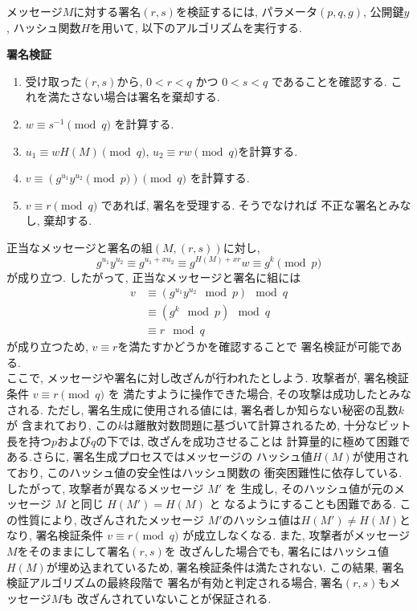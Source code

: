 \vspace{1em}
メッセージ$M$に対する署名$(r, s)$を検証するには, パラメータ$(p,q,g)$, 
公開鍵$y$, ハッシュ関数$H$を用いて, 以下のアルゴリズムを実行する.
\vspace{1em}
\let\ltxlist\list
\begin{breakitembox}[l]{\textbf{署名検証}}
  　
  \begin{enumerate}[parsep=7pt]
    \item 受け取った$(r,s)$から, $0<r<q$ かつ $0<s<q$ であることを確認する. 
    これを満たさない場合は署名を棄却する.
    \item $w\equiv s^{-1}\pmod q$ を計算する.
    \item $u_1\equiv wH(M)\pmod q$, $u_2\equiv rw\pmod q$を計算する.
    \item $v\equiv (g^{u_1}y^{u_2}\pmod p)\pmod q$ を計算する.
    \item $v\equiv r\pmod  q$ であれば, 署名を受理する. そうでなければ
    不正な署名とみなし, 棄却する.
  \end{enumerate}
\end{breakitembox}
\vspace{1em}
\indent 正当なメッセージと署名の組$(M, (r, s))$に対し, 
\[
  g^{u_1}y^{u_2}\equiv g^{u_1+xu_2} \equiv g^{H(M)+xr}w\equiv g^{k}\pmod p
\]
が成り立つ. したがって, 正当なメッセージと署名に組には 
\begin{align*}
  v &\equiv (g^{u_1}y^{u_2} \mod p) \mod q \\
    &\equiv (g^k \mod p) \mod q \\
    &\equiv r \mod q
\end{align*}
が成り立つため, $v\equiv r$を満たすかどうかを確認することで
署名検証が可能である.\\
\indent ここで, メッセージや署名に対し改ざんが行われたとしよう. 
攻撃者が, 署名検証条件 $v \equiv r \pmod{q}$ を
満たすように操作できた場合, その攻撃は成功したとみなされる. ただし, 
署名生成に使用される値には, 署名者しか知らない秘密の乱数$k$が
含まれており, この$k$は離散対数問題に基づいて計算されるため, 
十分なビット長を持つ$p$および$q$の下では, 改ざんを成功させることは
計算量的に極めて困難である.さらに, 署名生成プロセスではメッセージの
ハッシュ値$H(M)$が使用されており, このハッシュ値の安全性はハッシュ関数の
衝突困難性に依存している. したがって, 攻撃者が異なるメッセージ $M'$ を
生成し, そのハッシュ値が元のメッセージ $M$ と同じ $H(M') = H(M)$ と
なるようにすることも困難である. この性質により, 改ざんされたメッセージ
$M'$のハッシュ値は$H(M')\neq H(M)$となり, 
署名検証条件 $v \equiv r \pmod{q}$ が成立しなくなる.
また, 攻撃者がメッセージ$M$をそのままにして署名$(r, s)$を
改ざんした場合でも, 署名にはハッシュ値$H(M)$が埋め込まれているため, 
署名検証条件は満たされない. この結果, 署名検証アルゴリズムの最終段階で
署名が有効と判定される場合, 署名$(r, s)$もメッセージ$M$も
改ざんされていないことが保証される.\\[1em]

